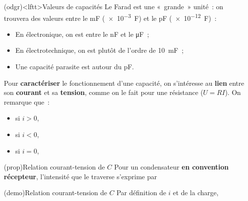 \documentclass[../../main/main.tex]{subfiles}
\begin{document}
\begin{tcb}(odgr)<lftt>{Valeurs de capacités}
	Le Farad est une «~grande~» unité~: on trouvera des valeurs entre le \si{mF}
	(\SI{e-3}{F}) et le \si{pF} (\SI{e-12}{F})~:
	\begin{itemize}
		\item En électronique, on est entre le \si{nF} et le \si{\micro F}~;
		\item En électrotechnique, on est plutôt de l'ordre de \SI{10}{mF}~;
		\item Une capacité parasite est autour du \si{pF}.
	\end{itemize}
\end{tcb}

Pour \textbf{caractériser} le fonctionnement d'une capacité, on s'intéresse au
\textbf{lien} entre son \textbf{courant} et sa \textbf{tension}, comme on le
fait pour une résistance ($U = RI$). On remarque que~:
\begin{itemize}
	\item si $i > 0$, %
	\item si $i < 0$, %
	\item si $i = 0$, %
\end{itemize}


\begin{tcb*}[label=prop:Ccarac](prop){Relation courant-tension de $C$}
	Pour un condensateur \textbf{en convention récepteur}, l'intensité que
	le traverse s'exprime par
	\psw{%
		\[\boxed{i = C \dv{u_C}{t}}\]
	}%
	\vspace{-15pt}
\end{tcb*}
\begin{tcb*}[label=demo:Ccarac](demo){Relation courant-tension de $C$}
	Par définition de $i$ et de la charge,
	\vspace{-15pt}
\end{tcb*}
\end{document}
